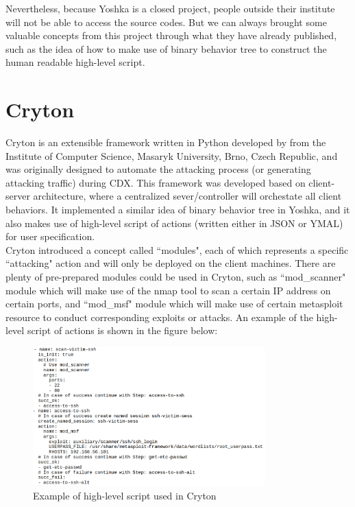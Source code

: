 \documentclass[12pt]{report}
\begin{document}
Nevertheless, because Yoshka is a closed project, people outside their institute will not be able to access the source codes. But we can always brought some valuable concepts from this project through what they have already published, such as the idea of how to make use of binary behavior tree to construct the human readable high-level script. 


\section{Cryton}

Cryton is an extensible framework written in Python developed by \citet{Cryton} from the Institute of Computer Science, Masaryk University, Brno, Czech Republic, and was originally designed to automate the attacking process (or generating attacking traffic) during CDX. This framework was developed based on client-server architecture, where a centralized sever/controller will orchestate all client behaviors. It implemented a similar idea of binary behavior tree in Yoshka, and it also makes use of high-level script of actions (written either in JSON or YMAL) for user specification.\\

Cryton introduced a concept called ``modules", each of which represents a specific ``attacking" action and will only be deployed on the client machines. There are plenty of pre-prepared modules could be used in Cryton, such as ``mod\_scanner" module which will make use of the nmap tool to scan a certain IP address on certain ports, and ``mod\_msf" module which will make use of certain metasploit resource to conduct corresponding exploits or attacks. An example of the high-level script of actions is shown in the figure below:

\begin{figure}[h!]
	\centering
	\includegraphics[width=0.8\textwidth]{./pictures/cryton-hls}
	\caption{Example of high-level script used in Cryton}
\end{figure}
\end{document}
